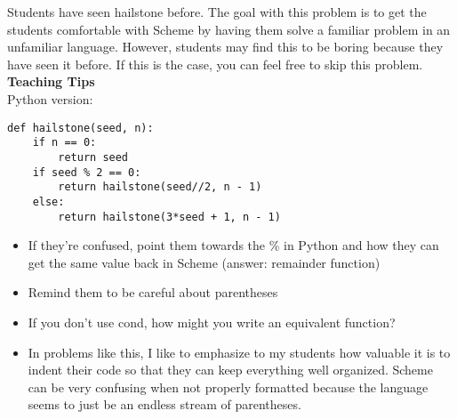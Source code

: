 \begin{guide}
\begin{blocksection}
Students have seen hailstone before. The goal with this problem is to get the students comfortable with Scheme by having them solve a familiar problem in an unfamiliar language. However, students may find this to be boring because they have seen it before. If this is the case, you can feel free to skip this problem. 
\vspace{10px} \\

\textbf{Teaching Tips} \\
Python version:
\begin{lstlisting}
def hailstone(seed, n):
    if n == 0:
        return seed
    if seed % 2 == 0:
        return hailstone(seed//2, n - 1)
    else:
        return hailstone(3*seed + 1, n - 1)
\end{lstlisting}
\begin{itemize}
    \item If they’re confused, point them towards the \% in Python and how they can get the same value back in Scheme (answer: remainder function) 
    \item Remind them to be careful about parentheses
    \item If you don’t use cond, how might you write an equivalent function? 
    \item In problems like this, I like to emphasize to my students how valuable it is to indent their code so that they can keep everything well organized. Scheme can be very confusing when not properly formatted because the language seems to just be an endless stream of parentheses. 
\end{itemize}
\end{blocksection}
\end{guide}